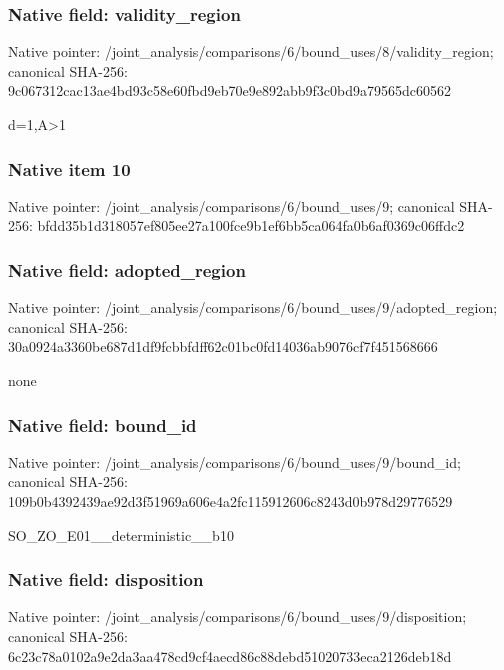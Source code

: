 \documentclass[10pt,a4paper]{article}
\begin{document}
\subsubsection{Native field: validity\_\allowbreak{}region}
Native pointer: /joint\_\allowbreak{}analysis/comparisons/6/bound\_\allowbreak{}uses/8/validity\_\allowbreak{}region; canonical SHA-256: 9c067312cac13ae4bd93c58e60fbd9eb70e9e892abb9f3c0bd9a79565dc60562

\begingroup\raggedright\sloppy d=\allowbreak{}1,\allowbreak{}A>1\par\endgroup

\subsubsection{Native item 10}
Native pointer: /joint\_\allowbreak{}analysis/comparisons/6/bound\_\allowbreak{}uses/9; canonical SHA-256: bfdd35b1d318057ef805ee27a100fce9b1ef6bb5ca064fa0b6af0369c06ffdc2

\subsubsection{Native field: adopted\_\allowbreak{}region}
Native pointer: /joint\_\allowbreak{}analysis/comparisons/6/bound\_\allowbreak{}uses/9/adopted\_\allowbreak{}region; canonical SHA-256: 30a0924a3360be687d1df9fcbbfdff62c01bc0fd14036ab9076cf7f451568666

\begingroup\raggedright\sloppy none\par\endgroup

\subsubsection{Native field: bound\_\allowbreak{}id}
Native pointer: /joint\_\allowbreak{}analysis/comparisons/6/bound\_\allowbreak{}uses/9/bound\_\allowbreak{}id; canonical SHA-256: 109b0b4392439ae92d3f51969a606e4a2fc115912606c8243d0b978d29776529

\begingroup\raggedright\sloppy SO\_\allowbreak{}ZO\_\allowbreak{}E01\_\allowbreak{}\_\allowbreak{}deterministic\_\allowbreak{}\_\allowbreak{}b10\par\endgroup

\subsubsection{Native field: disposition}
Native pointer: /joint\_\allowbreak{}analysis/comparisons/6/bound\_\allowbreak{}uses/9/disposition; canonical SHA-256: 6c23c78a0102a9e2da3aa478cd9cf4aecd86c88debd51020733eca2126deb18d
\end{document}

